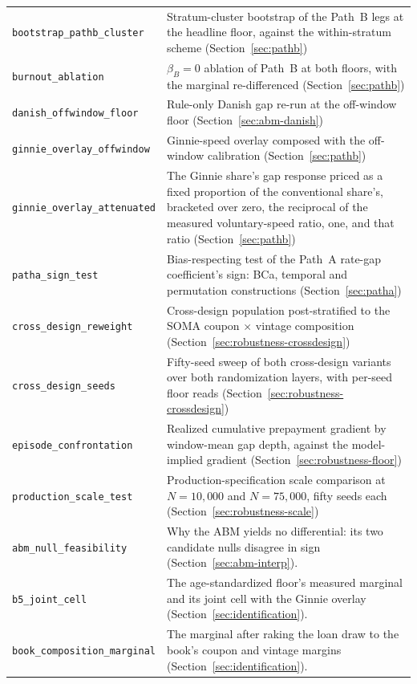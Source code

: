 \documentclass[12pt]{article}
\begin{document}
{\begin{longtable}{@{}p{5.4cm}p{8.8cm}@{}}
\texttt{bootstrap\_pathb\_cluster} & Stratum-cluster bootstrap of the Path~B legs at the headline floor, against the within-stratum scheme (Section~\ref{sec:pathb}) \\
\texttt{burnout\_ablation} & $\beta_B = 0$ ablation of Path~B at both floors, with the marginal re-differenced (Section~\ref{sec:pathb}) \\
\texttt{danish\_offwindow\_floor} & Rule-only Danish gap re-run at the off-window floor (Section~\ref{sec:abm-danish}) \\
\texttt{ginnie\_overlay\_offwindow} & Ginnie-speed overlay composed with the off-window calibration (Section~\ref{sec:pathb}) \\
\texttt{ginnie\_overlay\_attenuated} & The Ginnie share's gap response priced as a fixed proportion of the conventional share's, bracketed over zero, the reciprocal of the measured voluntary-speed ratio, one, and that ratio (Section~\ref{sec:pathb}) \\
\texttt{patha\_sign\_test} & Bias-respecting test of the Path~A rate-gap coefficient's sign: BCa, temporal and permutation constructions (Section~\ref{sec:patha}) \\
\texttt{cross\_design\_reweight} & Cross-design population post-stratified to the SOMA coupon $\times$ vintage composition (Section~\ref{sec:robustness-crossdesign}) \\
\texttt{cross\_design\_seeds} & Fifty-seed sweep of both cross-design variants over both randomization layers, with per-seed floor reads (Section~\ref{sec:robustness-crossdesign}) \\
\texttt{episode\_confrontation} & Realized cumulative prepayment gradient by window-mean gap depth, against the model-implied gradient (Section~\ref{sec:robustness-floor}) \\
\texttt{production\_scale\_test} & Production-specification scale comparison at $N = 10{,}000$ and $N = 75{,}000$, fifty seeds each (Section~\ref{sec:robustness-scale}) \\
\texttt{abm\_null\_feasibility} & Why the ABM yields no differential: its two candidate nulls disagree in sign (Section~\ref{sec:abm-interp}). \\
\texttt{b5\_joint\_cell} & The age-standardized floor's measured marginal and its joint cell with the Ginnie overlay (Section~\ref{sec:identification}). \\
\texttt{book\_composition\_marginal} & The marginal after raking the loan draw to the book's coupon and vintage margins (Section~\ref{sec:identification}). \\

\end{longtable}}
\end{document}
